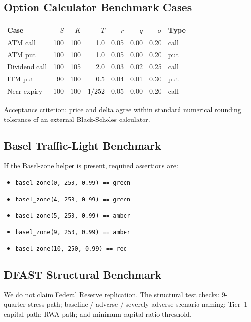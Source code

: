 \documentclass[11pt]{article}
\newcommand{\code}[1]{\texttt{#1}}
\begin{document}
\subsection{Option Calculator Benchmark Cases}

\begin{center}
\small
\begin{tabular}{L{2.2cm}rrrrrrl}
\toprule
\textbf{Case} & $S$ & $K$ & $T$ & $r$ & $q$ & $\sigma$ & \textbf{Type} \\
\midrule
ATM call    & 100 & 100 & 1.0 & 0.05 & 0.00 & 0.20 & call \\
ATM put     & 100 & 100 & 1.0 & 0.05 & 0.00 & 0.20 & put \\
Dividend call & 100 & 105 & 2.0 & 0.03 & 0.02 & 0.25 & call \\
ITM put     &  90 & 100 & 0.5 & 0.04 & 0.01 & 0.30 & put \\
Near-expiry & 100 & 100 & $1/252$ & 0.05 & 0.00 & 0.20 & call \\
\bottomrule
\end{tabular}
\end{center}

Acceptance criterion: price and delta agree within standard numerical
rounding tolerance of an external Black-Scholes calculator.

\subsection{Basel Traffic-Light Benchmark}

If the Basel-zone helper is present, required assertions are:

\begin{itemize}
  \item \code{basel\_zone(0, 250, 0.99) == green}
  \item \code{basel\_zone(4, 250, 0.99) == green}
  \item \code{basel\_zone(5, 250, 0.99) == amber}
  \item \code{basel\_zone(9, 250, 0.99) == amber}
  \item \code{basel\_zone(10, 250, 0.99) == red}
\end{itemize}

\subsection{DFAST Structural Benchmark}

We do not claim Federal Reserve replication.  The structural test checks:
9-quarter stress path; baseline / adverse / severely adverse scenario
naming; Tier~1 capital path; RWA path; and minimum capital ratio threshold.
\end{document}
